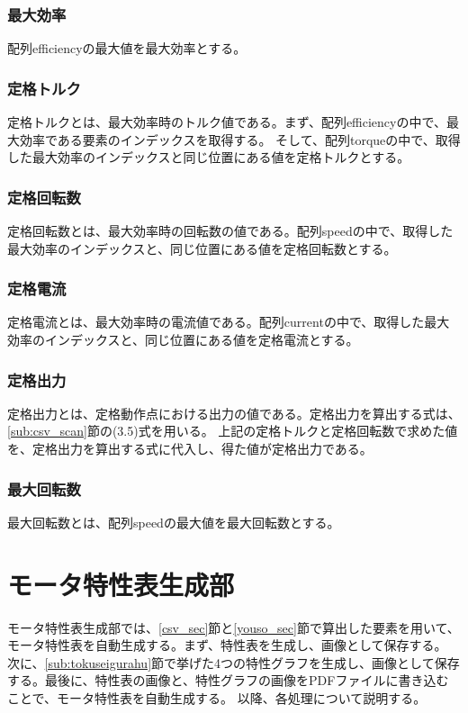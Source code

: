 \subsubsection{最大効率}\label{sub:sub:saidaikouritu}
配列efficiencyの最大値を最大効率とする。
\subsubsection{定格トルク}\label{sub:sub:teikakutoruku}
定格トルクとは、最大効率時のトルク値である。まず、配列efficiencyの中で、最大効率である要素のインデックスを取得する。
そして、配列torqueの中で、取得した最大効率のインデックスと同じ位置にある値を定格トルクとする。
\subsubsection{定格回転数}\label{sub:sub:teikakukaiten}
定格回転数とは、最大効率時の回転数の値である。配列speedの中で、取得した最大効率のインデックスと、同じ位置にある値を定格回転数とする。
\subsubsection{定格電流}\label{sub:sub:teikakuden}
定格電流とは、最大効率時の電流値である。配列currentの中で、取得した最大効率のインデックスと、同じ位置にある値を定格電流とする。
\subsubsection{定格出力}\label{sub:sub:teikakusyutu}
定格出力とは、定格動作点における出力の値である。定格出力を算出する式は、\ref{sub:csv_scan}節の(3.5)式を用いる。
上記の定格トルクと定格回転数で求めた値を、定格出力を算出する式に代入し、得た値が定格出力である。
\subsubsection{最大回転数}\label{sub:sub:saidaikai}
最大回転数とは、配列speedの最大値を最大回転数とする。
\section{モータ特性表生成部}\label{mortoku_sec}
モータ特性表生成部では、\ref{csv_sec}節と\ref{youso_sec}節で算出した要素を用いて、モータ特性表を自動生成する。まず、特性表を生成し、画像として保存する。
次に、\ref{sub:tokuseigurahu}節で挙げた4つの特性グラフを生成し、画像として保存する。最後に、特性表の画像と、特性グラフの画像をPDFファイルに書き込むことで、モータ特性表を自動生成する。
以降、各処理について説明する。
